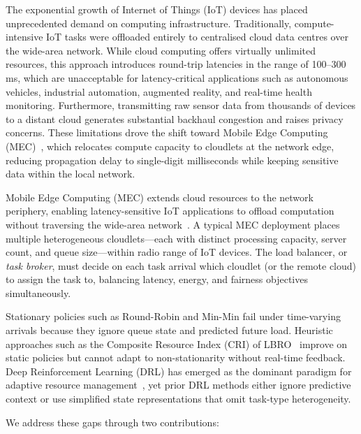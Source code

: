 \documentclass[conference]{IEEEtran}
\begin{document}
The exponential growth of Internet of Things (IoT) devices has placed
unprecedented demand on computing infrastructure. Traditionally,
compute-intensive IoT tasks were offloaded entirely to centralised
cloud data centres over the wide-area network. While cloud computing
offers virtually unlimited resources, this approach introduces
round-trip latencies in the range of 100--300\,ms, which are
unacceptable for latency-critical applications such as autonomous
vehicles, industrial automation, augmented reality, and real-time
health monitoring. Furthermore, transmitting raw sensor data from
thousands of devices to a distant cloud generates substantial
backhaul congestion and raises privacy concerns. These limitations
drove the shift toward Mobile Edge Computing (MEC)~\cite{shi2016edge},
which relocates compute capacity to cloudlets at the network edge,
reducing propagation delay to single-digit milliseconds while
keeping sensitive data within the local network.

Mobile Edge Computing (MEC) extends cloud resources to the network
periphery, enabling latency-sensitive IoT applications to offload
computation without traversing the wide-area network~\cite{shi2016edge}.
A typical MEC deployment places multiple heterogeneous cloudlets—each
with distinct processing capacity, server count, and queue size—within
radio range of IoT devices. The load balancer, or \emph{task broker},
must decide on each task arrival which cloudlet (or the remote cloud) to
assign the task to, balancing latency, energy, and fairness objectives
simultaneously.

Stationary policies such as Round-Robin and Min-Min fail under
time-varying arrivals because they ignore queue state and predicted
future load. Heuristic approaches such as the Composite Resource Index
(CRI) of LBRO~\cite{nayyer2022lbro} improve on static policies but
cannot adapt to non-stationarity without real-time feedback. Deep
Reinforcement Learning (DRL) has emerged as the dominant paradigm for
adaptive resource management~\cite{mao2016resource}, yet prior DRL
methods either ignore predictive context or use simplified state
representations that omit task-type heterogeneity.

We address these gaps through two contributions:
\end{document}

